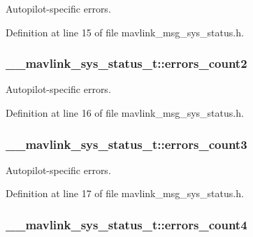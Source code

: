 Autopilot-\/specific errors. 



Definition at line 15 of file mavlink\-\_\-msg\-\_\-sys\-\_\-status.\-h.

\hypertarget{struct____mavlink__sys__status__t_a5a67792e19997897a415af3b4dba3d68}{
\subsubsection[{errors\-\_\-count2}]{ \-\_\-\-\_\-mavlink\-\_\-sys\-\_\-status\-\_\-t\-::errors\-\_\-count2}}\label{struct____mavlink__sys__status__t_a5a67792e19997897a415af3b4dba3d68}


Autopilot-\/specific errors. 



Definition at line 16 of file mavlink\-\_\-msg\-\_\-sys\-\_\-status.\-h.

\hypertarget{struct____mavlink__sys__status__t_aafca91f6177e4d0ed71410ac5b8f4ac8}{
\subsubsection[{errors\-\_\-count3}]{ \-\_\-\-\_\-mavlink\-\_\-sys\-\_\-status\-\_\-t\-::errors\-\_\-count3}}\label{struct____mavlink__sys__status__t_aafca91f6177e4d0ed71410ac5b8f4ac8}


Autopilot-\/specific errors. 



Definition at line 17 of file mavlink\-\_\-msg\-\_\-sys\-\_\-status.\-h.

\hypertarget{struct____mavlink__sys__status__t_a05303107ce28241b401f6383e6d6e634}{
\subsubsection[{errors\-\_\-count4}]{ \-\_\-\-\_\-mavlink\-\_\-sys\-\_\-status\-\_\-t\-::errors\-\_\-count4}}\label{struct____mavlink__sys__status__t_a05303107ce28241b401f6383e6d6e634}


